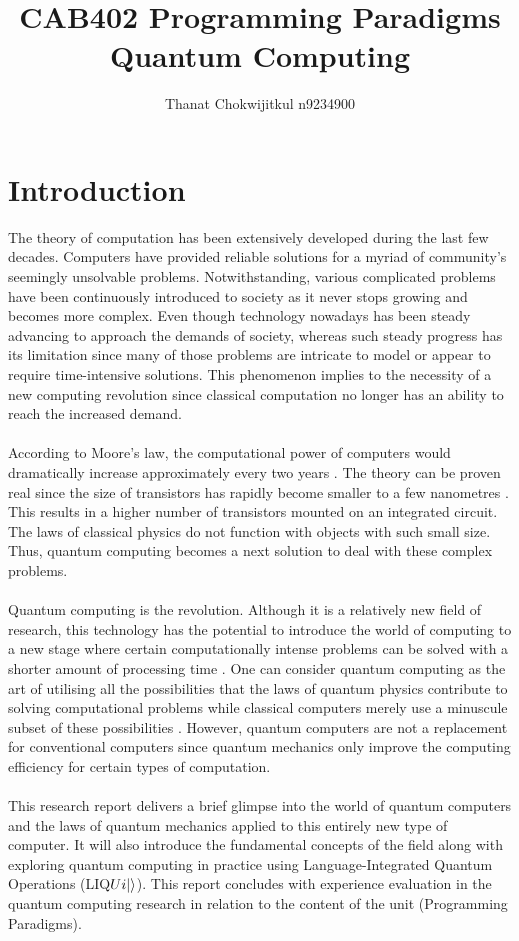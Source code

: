 \documentclass[12pt]{third-rep}
\title{CAB402 Programming Paradigms \\ \vspace{2 mm} {Quantum Computing}}
\author{Thanat Chokwijitkul n9234900}
\date{}
\begin{document}
\maketitle %

\tableofcontents
\listoffigures


\chapter{Introduction}

The theory of computation has been extensively developed during the last few decades. Computers have provided reliable solutions for a myriad of community's seemingly unsolvable problems. Notwithstanding, various complicated problems have been continuously introduced to society as it never stops growing and becomes more complex. Even though technology nowadays has been steady advancing to approach the demands of society, whereas such steady progress has its limitation since many of those problems are intricate to model or appear to require time-intensive solutions. This phenomenon implies to the necessity of a new computing revolution since classical computation no longer has an ability to reach the increased demand. \\\\
According to Moore's law, the computational power of computers would dramatically increase approximately every two years \cite{moore}. The theory can be proven real since the size of transistors has rapidly become smaller to a few nanometres \cite{qc-info}. This results in a higher number of transistors mounted on an integrated circuit. The laws of classical physics do not function with objects with such small size. Thus, quantum computing becomes a next solution to deal with these complex problems. \\\\
Quantum computing is the revolution. Although it is a relatively new field of research, this technology has the potential to introduce the world of computing to a new stage where certain computationally intense problems can be solved with a shorter amount of processing time \cite{non-physicists}. One can consider quantum computing as the art of utilising all the possibilities that the laws of quantum physics contribute to solving computational problems while classical computers merely use a minuscule subset of these possibilities \cite{qc-cc}. However, quantum computers are not a replacement for conventional computers since quantum mechanics only improve the computing efficiency for certain types of computation. \\\\
This research report delivers a brief glimpse into the world of quantum computers and the laws of quantum mechanics applied to this entirely new type of computer. It will also introduce the fundamental concepts of the field along with exploring quantum computing in practice using Language-Integrated Quantum Operations (LIQ$Ui{\left\vert{}\right\rangle}$). This report concludes with experience evaluation in the quantum computing research in relation to the content of the unit (Programming Paradigms).
\end{document}
